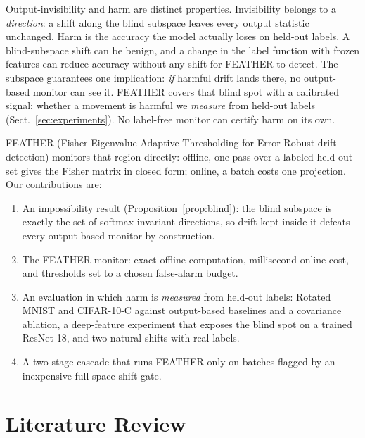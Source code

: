 \documentclass[graybox]{SNmult}
\begin{document}
Output-invisibility and harm are distinct properties. Invisibility belongs to a
\emph{direction}: a shift along the blind subspace leaves every output
statistic unchanged. Harm is the accuracy the model actually loses on held-out
labels. A blind-subspace shift can be benign, and a change in the label
function with frozen features can reduce accuracy without any shift for
FEATHER to detect. The subspace guarantees one implication: \emph{if} harmful
drift lands there, no output-based monitor can see it. FEATHER covers that
blind spot with a calibrated signal; whether a movement is harmful we
\emph{measure} from held-out labels (Sect.~\ref{sec:experiments}). No
label-free monitor can certify harm on its own.

FEATHER (Fisher-Eigenvalue Adaptive Thresholding for Error-Robust drift
detection) monitors that region directly: offline, one pass over a labeled
held-out set gives the Fisher matrix in closed form; online, a batch costs one
projection. Our contributions are:
\begin{enumerate}
  \item{An impossibility result (Proposition~\ref{prop:blind}): the blind
    subspace is exactly the set of softmax-invariant directions, so drift kept
    inside it defeats every output-based monitor by construction.}
  \item{The FEATHER monitor: exact offline computation, millisecond online
    cost, and thresholds set to a chosen false-alarm budget.}
  \item{An evaluation in which harm is \emph{measured} from held-out labels:
    Rotated MNIST and CIFAR-10-C against output-based baselines and a
    covariance ablation, a deep-feature experiment that exposes the blind spot
    on a trained ResNet-18, and two natural shifts with real labels.}
  \item{A two-stage cascade that runs FEATHER only on batches flagged by an
    inexpensive full-space shift gate.}
\end{enumerate}

\section{Literature Review}
\label{sec:related}
\end{document}
